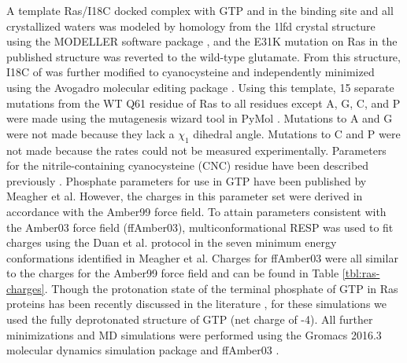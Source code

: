 A template Ras/\RalB{}I18C docked complex with GTP and  in the binding site and all crystallized waters was modeled by homology from the 1lfd crystal structure\cite{Huang1998} using the MODELLER software package \cite{Marti-Renom2000, Sali1993, Fiser2000}, and the E31K mutation on Ras in the published structure was reverted to the wild-type glutamate. 
From this structure, I18C of \RalB{} was further modified to cyanocysteine and independently minimized using the Avogadro molecular editing package \cite{Hanwell2012}. 
Using this template, 15 separate mutations from the WT Q61 residue of Ras to all residues except A, G, C, and P were made using the mutagenesis wizard tool in PyMol \cite{DeLano2002}.
Mutations to A and G were not made because they lack a $\chi_1$ dihedral angle. 
Mutations to C and P were not made because the rates could not be measured experimentally.
Parameters for the nitrile-containing cyanocysteine (CNC) residue have been described previously \cite{Stafford2010, Ensign2011}.
Phosphate parameters for use in GTP have been published by Meagher et al\cite{Meagher2003}.
However, the charges in this parameter set were derived in accordance with the Amber99 force field. 
To attain parameters consistent with the Amber03 force field (ffAmber03), multiconformational RESP\cite{Cornell1993, Bayly1993, Cieplak1995} was used to fit charges using the Duan et al. protocol\cite{Duan2003} in the seven minimum energy conformations identified in Meagher et al. 
Charges for ffAmber03 were all similar to the charges for the Amber99 force field and can be found in Table \ref{tbl:ras-charges}. 
Though the protonation state of the terminal phosphate of GTP in Ras proteins has been recently discussed in the literature \cite{Knihtila2015, Mann2018}, for these simulations we used the fully deprotonated structure of GTP (net charge of -4). 
All further minimizations and MD simulations were performed using the Gromacs 2016.3 molecular dynamics simulation package\cite{Berendsen1995, Lindahl2001, VanDerSpoel2005, Miyake-Stoner2009, Hess2008, Pronk2013, Pall2015, Abraham2015} and ffAmber03 \cite{Duan2003, Sorin2005}.

